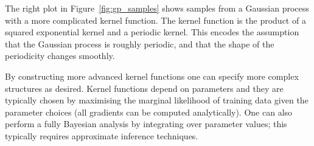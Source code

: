 \documentclass[preprint,authoryear,12pt]{elsarticle}
\begin{document}
The right plot in Figure~\ref{fig:gp_samples} shows samples from a Gaussian process with a more complicated kernel function.
The kernel function is the product of a squared exponential kernel and a periodic kernel.
This encodes the assumption that the Gaussian process is roughly periodic, and that the shape of the periodicity changes smoothly.

By constructing more advanced kernel functions one can specify more complex structures as desired.
Kernel functions depend on parameters and they are typically chosen by maximising the marginal likelihood of training data given the parameter choices (all gradients can be computed analytically).
One can also perform a fully Bayesian analysis by integrating over parameter values; this typically requires approximate inference techniques.




\end{document}
